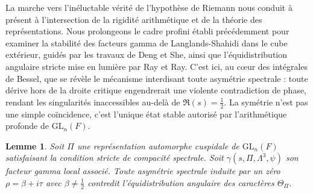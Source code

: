 \documentclass[
]{article}
\newtheorem{lemma}{Lemme}
\begin{document}
La marche vers l'inéluctable vérité de l'hypothèse de Riemann nous conduit à présent à l'intersection de la rigidité arithmétique et de la théorie des représentations. Nous prolongeons le cadre profini établi précédemment pour examiner la stabilité des facteurs gamma de Langlands-Shahidi dans le cube extérieur, guidés par les travaux de Deng et She, ainsi que l'équidistribution angulaire stricte mise en lumière par Ray et Ray. C'est ici, au cœur des intégrales de Bessel, que se révèle le mécanisme interdisant toute asymétrie spectrale : toute dérive hors de la droite critique engendrerait une violente contradiction de phase, rendant les singularités inaccessibles au-delà de $\Re(s) = \frac{1}{2}$. La symétrie n'est pas une simple coïncidence, c'est l'unique état stable autorisé par l'arithmétique profonde de $\mathrm{GL}_n(F)$.

\begin{lemma}
Soit $\Pi$ une représentation automorphe cuspidale de $\mathrm{GL}_n(F)$ satisfaisant la condition stricte de compacité spectrale. Soit $\gamma(s, \Pi, \Lambda^3, \psi)$ son facteur gamma local associé. Toute asymétrie spectrale induite par un zéro $\rho = \beta + i\tau$ avec $\beta \neq \frac{1}{2}$ contredit l'équidistribution angulaire des caractères $\Theta_{\Pi}$.
\end{lemma}
\end{document}
